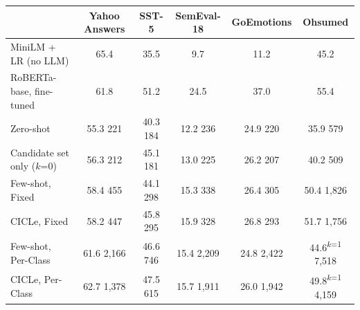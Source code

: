 \begin{tabular}{lccccc}
\toprule
 & Yahoo Answers & SST-5 & SemEval-18 & GoEmotions & Ohsumed \\
\midrule
MiniLM + LR (no LLM) & 65.4 & 35.5 & 9.7 & 11.2 & 45.2 \\
RoBERTa-base, fine-tuned & 61.8 & 51.2 & 24.5 & 37.0 & 55.4 \\
\midrule
Zero-shot & 55.3 {\scriptsize 221} & 40.3 {\scriptsize 184} & 12.2 {\scriptsize 236} & 24.9 {\scriptsize 220} & 35.9 {\scriptsize 579} \\
Candidate set only ($k$=0) & 56.3 {\scriptsize 212} & 45.1 {\scriptsize 181} & 13.0 {\scriptsize 225} & 26.2 {\scriptsize 207} & 40.2 {\scriptsize 509} \\
Few-shot, Fixed & 58.4 {\scriptsize 455} & 44.1 {\scriptsize 298} & 15.3 {\scriptsize 338} & 26.4 {\scriptsize 305} & 50.4 {\scriptsize 1,826} \\
CICLe, Fixed & 58.2 {\scriptsize 447} & 45.8 {\scriptsize 295} & 15.9 {\scriptsize 328} & 26.8 {\scriptsize 293} & 51.7 {\scriptsize 1,756} \\
Few-shot, Per-Class & 61.6 {\scriptsize 2,166} & 46.6 {\scriptsize 746} & 15.4 {\scriptsize 2,209} & 24.8 {\scriptsize 2,422} & 44.6\textsuperscript{$k$=1} {\scriptsize 7,518} \\
CICLe, Per-Class & 62.7 {\scriptsize 1,378} & 47.5 {\scriptsize 615} & 15.7 {\scriptsize 1,911} & 26.0 {\scriptsize 1,942} & 49.8\textsuperscript{$k$=1} {\scriptsize 4,159} \\
\bottomrule
\end{tabular}


